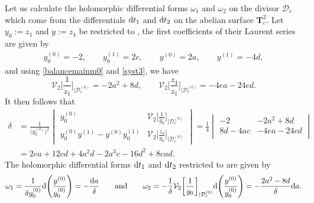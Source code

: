 \documentclass[10pt,a4paper]{amsart}
\numberwithin{equation}{section}
\begin{document}
 Let us calculate the holomorphic differential forms $\omega_1$ and
 $\omega_2$ on the divisor $\mathcal{D}_c$ which come from the differentials ${\rm d}t_1$ and ${\rm d}t_2$ on the abelian surface
 $\mathbf{T}^2_c$. Let $y_0:=z_1$ and $y:=z_4$ be
 restricted to , the first coefficients of their Laurent series are given by
 \begin{gather*}
y_0^{(0)}= -2, \qquad  y_0^{(1)}= 2c,\qquad
 y^{(0)}= 2a, \qquad  y^{(1)}=-4d,
 \end{gather*}
and using \eqref{balancemainm0} and \eqref{syst3},
 we have \[\mathcal{V}_2\biggl[\frac{1}{z_1}\biggr]_{|\mathcal{D}_c^{(0)}}=-2a^2+8d , \qquad
 \mathcal{V}_2\biggl[\frac{z_4}{z_1}\biggr]_{|\mathcal{D}_c^{(0)}}=-4ea-24cd.\]
It then follows that
\begin{align*}
 \delta &{}= \frac{1}{\bigl(y_0^{(0)}\bigr)^2}
 \begin{vmatrix}
 y_0^{(0)} & \mathcal{V}_2\bigl[\frac{1}{y_0}\bigr]_{|\mathcal{D}_c^{(0)}} \\[1mm]
 y_0^{(0)}y^{(1)}-y^{(0)}y_0^{(1)} & \mathcal{V}_2\bigl[\frac{z_4}{y_0}\bigr]_{|\mathcal{D}_c^{(0)}}
 \end{vmatrix}
 = \frac{1}{4}
 \begin{vmatrix}
 -2 & -2a^2+8d \\
 8d-4ac & -4ea-24cd \\
 \end{vmatrix}\\
 &{}= 2ea+12cd+4a^2d-2a^3c-16d^2+8cad.
\end{align*}
The holomorphic differential forms ${\rm d}t_1$ and ${\rm d}t_2$ restricted to
 are given by
\begin{gather*}
 \omega_1 = \frac{1}{\delta y_0^{(0)}}{\rm d}\Biggl(\frac{y^{(0)}}{y_0^{(0)}}\Biggr)=-\frac{{\rm d}a}{\delta }
 \qquad \text{and} \qquad
 \omega_2 = -\frac{1}{\delta }\mathcal{V}_2\biggl[\frac{1}{y_0}\biggr]_{|\mathcal{D}_c^{(0)}}
 {\rm d}\Biggl(\frac{y^{(0)}}{y_0^{(0)}}\Biggr)=-\frac{2a^2-8d}{\delta}{\rm d}a.
\end{gather*}
\end{document}
